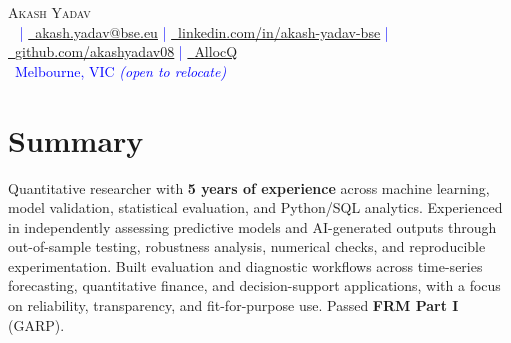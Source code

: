

\begin{center}
    {\Huge \scshape Akash Yadav} \\[3pt]
    \footnotesize
    \textcolor{blue}{
        \raisebox{-0.1\height}\faPhone\ \underline{\href{tel:\phonenum}{\phonenum}} | 
        \href{mailto:akash.yadav@bse.eu}{\raisebox{-0.2\height}\faEnvelope\  \underline{akash.yadav@bse.eu}} | 
        \href{https://www.linkedin.com/in/akash-yadav-bse}{\raisebox{-0.2\height}\faLinkedin\ \underline{linkedin.com/in/akash-yadav-bse}} |
        \href{https://github.com/akashyadav08}
        {\raisebox{-0.2\height}\faGithub\ \underline{github.com/akashyadav08}} |
        \href{https://www.allocq.com/}
        {\raisebox{-0.1\height}\faAllocQ\ \underline{AllocQ}}  \\
        {\raisebox{-0.1\height}\faMapMarker\ Melbourne, VIC} \textit{(open to relocate)}
    }
\end{center}

\section*{Summary}
\noindent
\small
\justifying %
Quantitative researcher with \textbf{5 years of experience} across machine learning, model validation, statistical evaluation, and Python/SQL analytics. Experienced in independently assessing predictive models and AI-generated outputs through out-of-sample testing, robustness analysis, numerical checks, and reproducible experimentation. Built evaluation and diagnostic workflows across time-series forecasting, quantitative finance, and decision-support applications, with a focus on reliability, transparency, and fit-for-purpose use. Passed \textbf{FRM Part I} (GARP).


